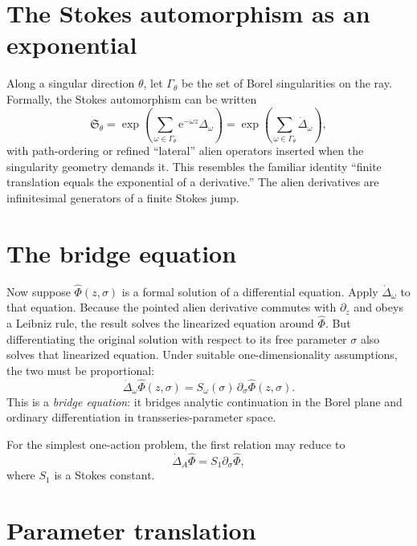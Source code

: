 \documentclass[11pt,oneside]{book}
\theoremstyle{definition}
\theoremstyle{remark}
\newcommand{\e}{\mathrm{e}}
\begin{document}
\section{The Stokes automorphism as an exponential}

Along a singular direction $\theta$, let $\Gamma_\theta$ be the set of Borel
singularities on the ray. Formally, the Stokes automorphism can be written
\begin{equation}
  \mathfrak S_\theta
  =\exp\!\left(
      \sum_{\omega\in\Gamma_\theta}
      \e^{-\omega z}\Delta_\omega
    \right)
  =\exp\!\left(
      \sum_{\omega\in\Gamma_\theta}
      \dot\Delta_\omega
    \right),
  \label{eq:stokes-auto-alien}
\end{equation}
with path-ordering or refined ``lateral'' alien operators inserted when the
singularity geometry demands it. This resembles the familiar identity
``finite translation equals the exponential of a derivative.'' The alien
derivatives are infinitesimal generators of a finite Stokes jump.

\section{The bridge equation}

Now suppose $\widehat\Phi(z,\sigma)$ is a formal solution of a differential
equation. Apply $\dot\Delta_\omega$ to that equation. Because the pointed alien
derivative commutes with $\partial_z$ and obeys a Leibniz rule, the result solves
the linearized equation around $\widehat\Phi$. But differentiating the original
solution with respect to its free parameter $\sigma$ also solves that linearized
equation. Under suitable one-dimensionality assumptions, the two must be
proportional:
\begin{equation}
  \dot\Delta_\omega\widehat\Phi(z,\sigma)
  =S_\omega(\sigma)\,
    \partial_\sigma\widehat\Phi(z,\sigma).
  \label{eq:bridge-equation-general}
\end{equation}
This is a \emph{bridge equation}: it bridges analytic continuation in the Borel
plane and ordinary differentiation in transseries-parameter space.

For the simplest one-action problem, the first relation may reduce to
\begin{equation}
  \dot\Delta_A\widehat\Phi
  =S_1\partial_\sigma\widehat\Phi,
  \label{eq:simple-bridge-equation}
\end{equation}
where $S_1$ is a Stokes constant.

\section{Parameter translation}
\end{document}
